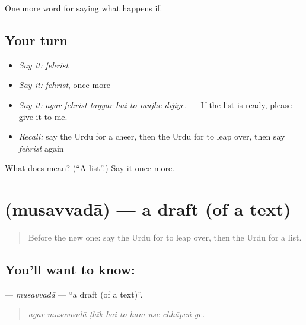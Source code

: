 \begin{grammarlens}[title={What you've built}]
One more word for saying what happens if.
\end{grammarlens}

\subsection*{Your turn}
\begin{itemize}
\raggedright
  \item \emph{Say it:} \emph{fehrist}
  \item \emph{Say it:} \emph{fehrist}, once more
  \item \emph{Say it:} \emph{agar fehrist tayyār hai to mujhe dījiye.} — If the list is ready, please give it to me.
  \item \emph{Recall:} say the Urdu for a cheer, then the Urdu for to leap over, then say \emph{fehrist} again
\end{itemize}

\begin{tcolorbox}[breakable,colback=teal!4,colframe=teal!35!black,title={Before you move on}]
What does  mean? (\textquotedblleft{}A list\textquotedblright{}.) Say it once more.
\end{tcolorbox}
\section[\texorpdfstring{\ur{مسودہ} (musavvadā)}{مسودہ (musavvadā)}]{ (musavvadā) — a draft (of a text)}

\label{lesson:UR-C524-musavvada}



\begin{quote}
Before the new one: say the Urdu for to leap over, then the Urdu for a list.
\end{quote}

\subsection*{You'll want to know: }
\textbf{} — \emph{musavvadā} — \textquotedblleft{}a draft (of a text)\textquotedblright{}.

\begin{quote}
        
\end{quote}

\begin{quote}
\emph{agar musavvadā ṭhīk hai to ham use chhāpeṅ ge.}
\end{quote}

